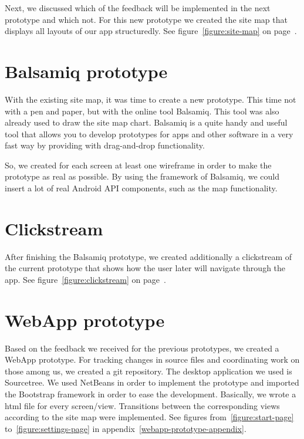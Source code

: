 \documentclass[11pt,twoside,a4paper]{report}
\begin{document}
Next, we discussed which of the feedback will be implemented in the next prototype and which not. For this new prototype we created the site map that displays all layouts of our app structuredly. See figure~\ref{figure:site-map} on page~\pageref{figure:site-map}.

\section{Balsamiq prototype}

With the existing site map, it was time to create a new prototype. This time not with a pen and paper, but with the online tool Balsamiq. This tool was also already used to draw the site map chart. Balsamiq is a quite handy and useful tool that allows you to develop prototypes for apps and other software in a very fast way by providing with drag-and-drop functionality.

So, we created for each screen at least one wireframe in order to make the prototype as real as possible. By using the framework of Balsamiq, we could
insert a lot of real Android API components, such as the map functionality.

\section{Clickstream}

After finishing the Balsamiq prototype, we created additionally a clickstream of the current prototype that shows how the user later will navigate through the app. See figure~\ref{figure:clickstream} on page~\pageref{figure:clickstream}.

\section{WebApp prototype}

Based on the feedback we received for the previous prototypes, we created a WebApp prototype. For tracking changes in source files and coordinating work on those among us, we created a git repository. The desktop application we used is Sourcetree. We used NetBeans in order to implement the prototype and imported the Bootstrap framework in order to ease the development. Basically, we wrote a html file for every screen/view. Transitions between the corresponding views according to the site map were implemented. See figures from~\ref{figure:start-page} to~\ref{figure:settings-page} in appendix~\ref{webapp-prototype-appendix}.
\end{document}
